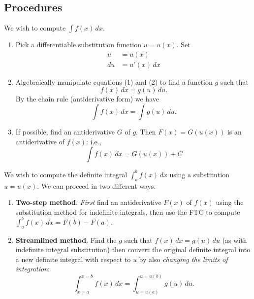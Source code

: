 \subsection*{Procedures}
\begin{namedtheorem} We wish to compute
$
\displaystyle\int f(x)\, dx.
$
\begin{enumerate}[itemsep=0pt, topsep=0pt]
  \item Pick a differentiable substitution function $u=u(x)$. Set
  \begin{align}
    u&=u(x)\\
    du&=u'(x)\, dx
  \end{align}
  \item Algebraically manipulate equations (1) and (2) to find a function $g$ such that
  \[
  f(x)\, dx=g(u)\, du.
  \]
  By the chain rule (antiderivative form) we have
  \[
  \int f(x)\, dx=\int g(u)\, du.
  \]
  \item If possible, find an antiderivative $G$ of $g$. Then $F(x)=G(u(x))$ is an antiderivative of $f(x)$: i.e.,
  \[
  \int f(x)\, dx=G(u(x))+C
  \]
\end{enumerate}

\end{namedtheorem}
\begin{comment}
There is no such thing as a {\em correct} or {\em incorrect} substitution, and you are encouraged to be creative with your choice of substitution $u(x)$. Instead think of a substitution as either {\em helpful} or {\em not helpful} (or possibly {\em somewhat helpful}). The success of a particular choice of $u(x)$ depends on two factors:
\begin{enumerate}[itemsep=0pt, topsep=0pt]
  \item Can you algebraically find a function $g$ such that $f(x)=g(u(x))u'(x)$?
  \item Having found a suitable $g$, can you find an antiderivative $G$ of $g$?
\end{enumerate}
\end{comment}
\newpage
\begin{namedtheorem}
We wish to compute the definite integral $\displaystyle\int_a^b f(x)\, dx$ using a substitution $u=u(x)$. We can proceed in two different ways.
\begin{enumerate}[itemsep=0pt]
  \item {\bf Two-step method}. {\em First} find an antiderivative $F(x)$ of $f(x)$ using the substitution method for indefinite integrals, then use the FTC to compute $\displaystyle\int_a^bf(x)\, dx=F(b)-F(a)$.
  \item {\bf Streamlined method}. Find the $g$ such that $f(x)\, dx=g(u)\, du$ (as with indefinite integral substitution) then convert the original definite integral into a new definite integral with respect to $u$ by also {\em changing the limits of integration}:
  \[
  \int_{x=a}^{x=b}f(x)\, dx=\int_{u=u(a)}^{u=u(b)}g(u)\, du.
  \]
\end{enumerate}
\end{namedtheorem}

